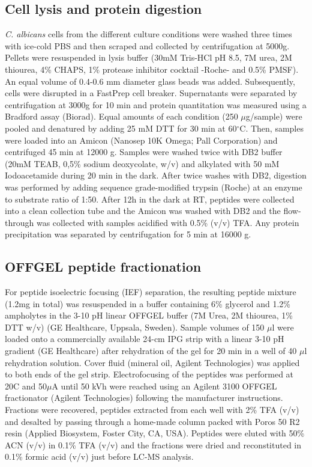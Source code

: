 \subsection*{Cell lysis and protein digestion}

\textit{C. albicans} cells from the different culture conditions were washed three times with ice-cold
PBS and then scraped and collected by centrifugation at 5000g. Pellets were resuspended in
lysis buffer (30mM Tris-HCl pH 8.5, 7M urea, 2M thiourea, 4\% CHAPS, 1\% protease inhibitor
cocktail -Roche- and 0.5\% PMSF). An equal volume of 0.4-0.6 mm diameter glass beads
was added. Subsequently, cells were disrupted in a FastPrep cell breaker. Supernatants
were separated by centrifugation at 3000g for 10 min and protein quantitation was measured
using a Bradford assay (Biorad).
Equal amounts of each condition (250 $\mu$g/sample) were pooled and denatured by adding 25
mM DTT for 30 min at 60$^{\circ}$C. Then, samples were loaded into an Amicon (Nanosep 10K
Omega; Pall Corporation) and centrifuged 45 min at 12000 g. Samples were washed twice
with DB2 buffer (20mM TEAB, 0,5\% sodium deoxycolate, w/v) and alkylated with 50 mM
Iodoacetamide during 20 min in the dark. After twice washes with DB2, digestion was
performed by adding sequence grade-modified trypsin (Roche) at an enzyme to substrate
ratio of 1:50. After 12h in the dark at RT, peptides were collected into a clean collection tube
and the Amicon was washed with DB2 and the flow-through was collected with samples
acidified with 0.5\% (v/v) TFA. Any protein precipitation was separated by centrifugation for 5
min at 16000 g.


\subsection*{OFFGEL peptide fractionation}

For peptide isoelectric focusing (IEF) separation, the resulting peptide mixture (1.2mg in
total) was resuspended in a buffer containing 6\% glycerol and 1.2\% ampholytes in the 3-10
pH linear OFFGEL buffer (7M Urea, 2M thiourea, 1\% DTT w/v) (GE Healthcare, Uppsala,
Sweden). Sample volumes of 150  $\mu$l were loaded onto a commercially available 24-cm IPG
strip with a linear 3-10 pH gradient (GE Healthcare) after rehydration of the gel for 20 min in
a well of 40 $\mu$l rehydration solution. Cover fluid (mineral oil, Agilent Technologies) was applied
to both ends of the gel strip. Electrofocusing of the peptides was performed at 20C and 50$\mu$A 
until 50 kVh were reached using an Agilent 3100 OFFGEL fractionator (Agilent
Technologies) following the manufacturer instructions. Fractions were recovered, peptides
extracted from each well with 2\% TFA (v/v) and desalted by passing through a home-made
column packed with Poros 50 R2 resin (Applied Biosystem, Foster City, CA, USA). Peptides
were eluted with 50\% ACN (v/v) in 0.1\% TFA (v/v) and the fractions were dried and reconstituted in
0.1\% formic acid (v/v) just before LC-MS analysis.


